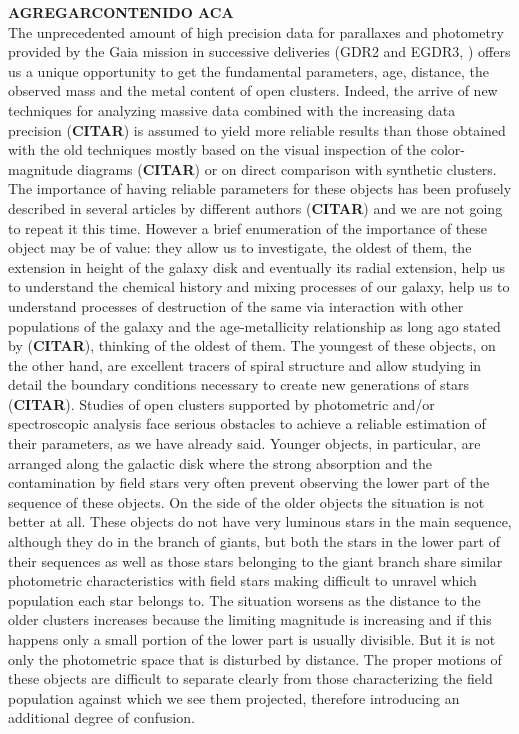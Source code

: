 \documentclass{aa}
\begin{document}
 \textbf{AGREGARCONTENIDO ACA}\\
 The unprecedented amount of high precision data for parallaxes and photometry provided by the Gaia mission in successive deliveries (GDR2 and EGDR3, \cite{Gaia_2016,Gaia_EDR3}) offers us a unique opportunity to get the fundamental parameters, age, distance, the observed mass and the metal content of open clusters. Indeed, the arrive of new techniques for analyzing massive data 
 combined with the increasing data precision (\textbf{CITAR}) is assumed to yield more reliable results than those obtained with the old techniques mostly based on the visual inspection of the color-magnitude diagrams  (\textbf{CITAR}) or on direct comparison with synthetic clusters. The importance of having
 reliable parameters for these objects has been profusely described in several articles by different authors (\textbf{CITAR}) and we are not going to repeat it this time. However a brief enumeration of the importance of these object may be of value: they allow us to investigate, the oldest of them, the extension in height of the galaxy disk and eventually its radial extension, help us to understand the chemical history and mixing processes of our galaxy, help us to understand processes of destruction of the same via interaction with other populations of the galaxy and the age-metallicity relationship as long ago stated by (\textbf{CITAR}), 
 thinking of the oldest of them. The youngest of these objects, on the other hand, are excellent tracers of spiral structure and allow studying in detail 
 the boundary conditions necessary to create new generations of stars (\textbf{CITAR}).
Studies of open clusters supported by photometric and/or spectroscopic analysis face 
serious obstacles to achieve a reliable estimation of their parameters, as 
we have already said. Younger objects, in particular, are arranged along the 
galactic disk where the strong absorption and the contamination by 
field stars very often prevent observing the lower part of the sequence of 
these objects. On the side of the older objects the situation is not better at all. These objects do not have very luminous stars in the main sequence, although they do in the branch of giants, but both the stars in the lower part of their sequences as well as those stars belonging to the giant branch share similar photometric characteristics with field stars making difficult to unravel which population each star belongs to. 
The situation worsens as the distance to the older clusters increases because the limiting magnitude is increasing and if this happens only a small portion 
of the lower part is usually divisible. But it is not only the photometric space that is disturbed by distance. The proper motions of these objects are difficult to separate clearly from those characterizing the field population against which we see them projected, therefore introducing an additional degree of confusion.
\end{document}
